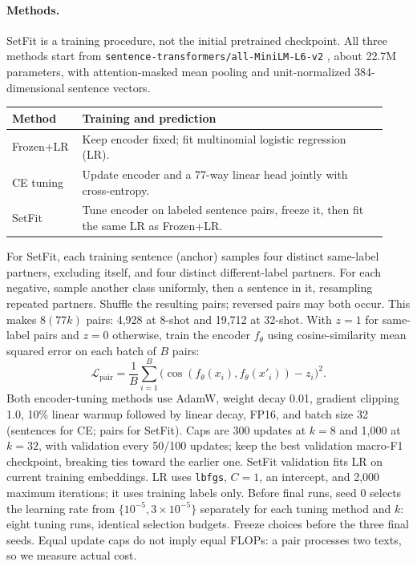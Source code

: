 \documentclass{article}
\begin{document}
\paragraph{Methods.}
SetFit is a training procedure, not the initial pretrained checkpoint. All three methods start from \texttt{sentence-transformers/all-MiniLM-L6-v2} \cite{minilmhub}, about 22.7M parameters, with attention-masked mean pooling and unit-normalized 384-dimensional sentence vectors.
\begin{center}
\small
\begin{tabular}{@{}p{0.15\linewidth}p{0.78\linewidth}@{}}
\toprule
Method & Training and prediction\\
\midrule
Frozen+LR & Keep encoder fixed; fit multinomial logistic regression (LR).\\
CE tuning & Update encoder and a 77-way linear head jointly with cross-entropy.\\
SetFit & Tune encoder on labeled sentence pairs, freeze it, then fit the same LR as Frozen+LR.\\
\bottomrule
\end{tabular}
\end{center}
For SetFit, each training sentence (anchor) samples four distinct same-label partners, excluding itself, and four distinct different-label partners. For each negative, sample another class uniformly, then a sentence in it, resampling repeated partners. Shuffle the resulting pairs; reversed pairs may both occur. This makes $8(77k)$ pairs: 4,928 at 8-shot and 19,712 at 32-shot. With $z=1$ for same-label pairs and $z=0$ otherwise, train the encoder $f_\theta$ using cosine-similarity mean squared error on each batch of $B$ pairs:
\[
\mathcal L_{\mathrm{pair}}=\frac{1}{B}\sum_{i=1}^{B}\bigl(\cos(f_\theta(x_i),f_\theta(x'_i))-z_i\bigr)^2.
\]
Both encoder-tuning methods use AdamW, weight decay 0.01, gradient clipping 1.0, 10\% linear warmup followed by linear decay, FP16, and batch size 32 (sentences for CE; pairs for SetFit). Caps are 300 updates at $k=8$ and 1,000 at $k=32$, with validation every 50/100 updates; keep the best validation macro-F1 checkpoint, breaking ties toward the earlier one. SetFit validation fits LR on current training embeddings. LR uses \texttt{lbfgs}, $C=1$, an intercept, and 2,000 maximum iterations; it uses training labels only. Before final runs, seed 0 selects the learning rate from $\{10^{-5},3\!\times\!10^{-5}\}$ separately for each tuning method and $k$: eight tuning runs, identical selection budgets. Freeze choices before the three final seeds. Equal update caps do not imply equal FLOPs: a pair processes two texts, so we measure actual cost.
\end{document}
